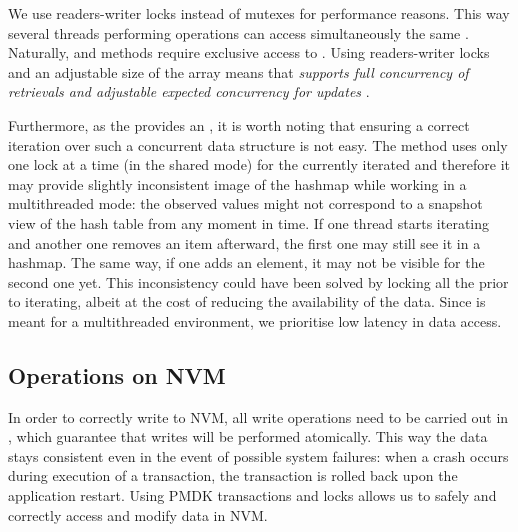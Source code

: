     We use readers-writer locks instead of mutexes for performance reasons. This way several threads performing \getMethod operations can access simultaneously the same \internalHashMap. Naturally, \insertMethod and \removeMethod methods require exclusive access to \internalHashMap. Using readers-writer locks and an adjustable size of the \internalHashMap array means that \PHT \emph{supports full concurrency of retrievals and adjustable expected concurrency for updates} \cite{ConcurrentHashMapJava}. 
    
    Furthermore, as the \NvmHashMap provides an \Iterator, it is worth noting that ensuring a correct iteration over such a concurrent data structure is not easy. The \iterateMethod method uses only one lock at a time (in the shared mode) for the currently iterated \internalHashMap and therefore it may provide slightly inconsistent image of the hashmap while working in a multithreaded mode: the observed values might not correspond to a snapshot view of the hash table from any moment in time. If one thread starts iterating and another one removes an item afterward, the first one may still see it in a hashmap. The same way, if one adds an element, it may not be visible for the second one yet. This inconsistency could have been solved by locking all the \internalHashMaps prior to iterating, albeit at the cost of reducing the availability of the data. Since \PHT is meant for a multithreaded environment, we prioritise low latency in data access.

\subsection{Operations on NVM}

    In order to correctly write to NVM, all write operations need to be carried out in \pmdktransactions, which guarantee that writes will be performed atomically. 
    This way the data stays consistent even in the event of possible system failures: when a crash occurs during execution of a transaction, the transaction is rolled back upon the application restart. Using PMDK transactions and locks allows us to safely and correctly access and modify data in NVM.


